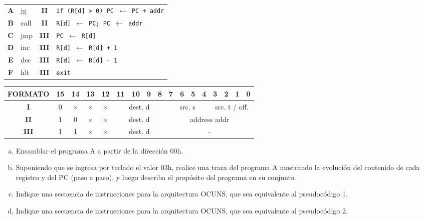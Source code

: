 \documentclass[12pt,a4paper]{article}
\begin{document}
\begin{small}
\begin{minipage}{.6\textwidth}
\begin{tabular}{|c|l|c|l|}
			\textbf{A} & \textsf{jg}    & \textbf{II} & \texttt{if (R[d] >{} 0) PC $\leftarrow$ PC + addr} \\
			\textbf{B} & \textsf{call}  & \textbf{II} & \texttt{R[d] $\leftarrow$ PC; PC $\leftarrow$ addr} \\
			\textbf{C} & \textsf{jmp}   & \textbf{III} & \texttt{PC $\leftarrow$ R[d]} \\
			\textbf{D} & \textsf{inc}   & \textbf{III} & \texttt{R[d] $\leftarrow$ R[d] + 1} \\
			\textbf{E} & \textsf{dec}   & \textbf{III} & \texttt{R[d] $\leftarrow$ R[d] - 1} \\
			\textbf{F} & \textsf{hlt}   & \textbf{III} & \texttt{exit} \\ \hline
		\end{tabular}	
	\end{minipage}
	\begin{center}
		\begin{tabular}{*{17}{c}}
			\textsf{FORMATO} & 15 & 14 & 13 & 12 & 11 & 10 & 9 & 8 & 7 & 6 & 5 & 4 & 3 & 2 & 1 & 0 \\ \hline
			\multicolumn{1}{|c|}{\textbf{I}} & 0 & $\times$ & $\times$ & $\times$ &
			\multicolumn{4}{|c|}{\textsf{dest. d}} &
			\multicolumn{4}{|c|}{\textsf{src. s}} &
			\multicolumn{4}{|c|}{\textsf{src. t / off.}} \\ \hline
			\multicolumn{1}{|c|}{\textbf{II}} & 1 & 0 & $\times$ & $\times$ &
			\multicolumn{4}{|c|}{\textsf{dest. d}} &
			\multicolumn{8}{|c|}{\textsf{address addr}} \\ \hline
			\multicolumn{1}{|c|}{\textbf{III}} & 1 & 1 & $\times$ & $\times$ &
			\multicolumn{4}{|c|}{\textsf{dest. d}} &
			\multicolumn{8}{|c|}{\textsf{-}} \\ \hline
		\end{tabular}
	\end{center}		
\end{small}
\begin{small}
\begin{enumerate}[a)]
	\item Ensamblar el programa A a partir de la dirección 00h.
	\item Suponiendo que se ingresa por teclado el valor 03h, realice una traza del programa A mostrando la evolución del contenido de cada registro y del PC (paso a paso), y luego describa el propósito del programa en su conjunto.
	\item Indique una secuencia de instrucciones para la arquitectura OCUNS, que sea equivalente al pseudocódigo 1.
	\item Indique una secuencia de instrucciones para la arquitectura OCUNS, que sea equivalente al pseudocódigo 2.	
\end{enumerate}
\end{small}
\end{document}
